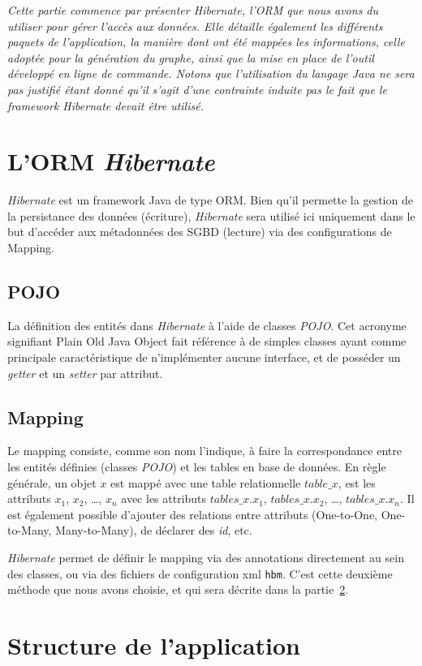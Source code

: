 \textit{Cette partie commence par présenter \emph{Hibernate}, l'ORM que nous avons du utiliser pour gérer l'accès aux données. Elle détaille également les différents paquets de l'application, la manière dont ont été mappées les informations, celle adoptée pour la génération du graphe, ainsi que la mise en place de l'outil développé en ligne de commande. Notons que l'utilisation du langage Java ne sera pas justifié étant donné qu'il s'agit d'une contrainte induite pas le fait que le framework \emph{Hibernate} devait être utilisé.}

\section{L'ORM \emph{Hibernate}}
\emph{Hibernate} est un framework Java de type ORM. Bien qu'il permette la gestion de la persistance des données (écriture), \emph{Hibernate} sera utilisé ici uniquement dans le but d'accéder aux métadonnées des SGBD (lecture) via des configurations de Mapping.
\subsection{POJO}
La définition des entités dans \emph{Hibernate} à l'aide de classes \emph{POJO}. Cet acronyme signifiant \og Plain Old Java Object \fg{} fait référence à de simples classes ayant comme principale caractéristique de n'implémenter aucune interface, et de posséder un \emph{getter} et un \emph{setter} par attribut.
\subsection{Mapping}
Le mapping consiste, comme son nom l'indique, à faire la correspondance entre les entités définies (classes \emph{POJO}) et les tables en base de données. En règle générale, un objet $x$ est mappé avec une table relationnelle $table\_x$, est les attributs $x_1$, $x_2$, \ldots, $x_n$ avec les attributs $tables\_x.x_1$, $tables\_x.x_2$, \ldots, $tables\_x.x_n$. Il est également possible d'ajouter des relations entre attributs (One-to-One, One-to-Many, Many-to-Many), de déclarer des \emph{id}, etc.

\emph{Hibernate} permet de définir le mapping via des annotations directement au sein des classes, ou via des fichiers de configuration xml \texttt{hbm}. C'est cette deuxième méthode que nous avons choisie, et qui sera décrite dans la partie~\ref{section:structure_de_lapplication}.

\section{Structure de l'application}
\label{section:structure_de_lapplication}


